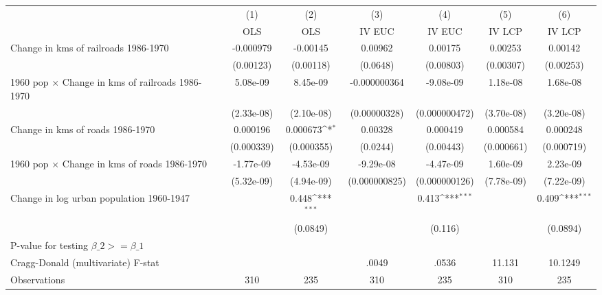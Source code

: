 {
\def\sym#1{\ifmmode^{#1}\else\(^{#1}\)\fi}
\begin{tabular}{l*{6}{c}}
\hline\hline
                &\multicolumn{1}{c}{(1)}&\multicolumn{1}{c}{(2)}&\multicolumn{1}{c}{(3)}&\multicolumn{1}{c}{(4)}&\multicolumn{1}{c}{(5)}&\multicolumn{1}{c}{(6)}\\
                &\multicolumn{1}{c}{OLS}&\multicolumn{1}{c}{OLS}&\multicolumn{1}{c}{IV EUC}&\multicolumn{1}{c}{IV EUC}&\multicolumn{1}{c}{IV LCP}&\multicolumn{1}{c}{IV LCP}\\
\hline
Change in kms of railroads 1986-1970&-0.000979         & -0.00145         &  0.00962         &  0.00175         &  0.00253         &  0.00142         \\
                &(0.00123)         &(0.00118)         & (0.0648)         &(0.00803)         &(0.00307)         &(0.00253)         \\
[1em]
1960 pop $\times$ Change in kms of railroads 1986-1970& 5.08e-09         & 8.45e-09         &-0.000000364         &-9.08e-09         & 1.18e-08         & 1.68e-08         \\
                &(2.33e-08)         &(2.10e-08)         &(0.00000328)         &(0.000000472)         &(3.70e-08)         &(3.20e-08)         \\
[1em]
Change in kms of roads 1986-1970& 0.000196         & 0.000673\sym{*}  &  0.00328         & 0.000419         & 0.000584         & 0.000248         \\
                &(0.000339)         &(0.000355)         & (0.0244)         &(0.00443)         &(0.000661)         &(0.000719)         \\
[1em]
1960 pop $\times$ Change in kms of roads 1986-1970&-1.77e-09         &-4.53e-09         &-9.29e-08         &-4.47e-09         & 1.60e-09         & 2.23e-09         \\
                &(5.32e-09)         &(4.94e-09)         &(0.000000825)         &(0.000000126)         &(7.78e-09)         &(7.22e-09)         \\
[1em]
Change in log urban population 1960-1947&                  &    0.448\sym{***}&                  &    0.413\sym{***}&                  &    0.409\sym{***}\\
                &                  & (0.0849)         &                  &  (0.116)         &                  & (0.0894)         \\
\hline
P-value for testing $\beta\_{2} >= \beta\_{1}$&                  &                  &                  &                  &                  &                  \\
Cragg-Donald (multivariate) F-stat&                  &                  &    .0049         &    .0536         &   11.131         &  10.1249         \\
Observations    &      310         &      235         &      310         &      235         &      310         &      235         \\
\hline\hline
\end{tabular}
}

